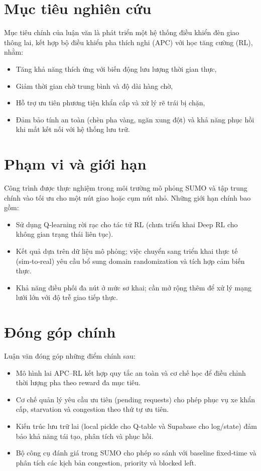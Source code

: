 \section{Mục tiêu nghiên cứu}

Mục tiêu chính của luận văn là phát triển một hệ thống điều khiển đèn giao thông lai, kết hợp bộ điều khiển pha thích nghi (APC) với học tăng cường (RL), nhằm:
\begin{itemize}
    \item Tăng khả năng thích ứng với biến động lưu lượng thời gian thực,
    \item Giảm thời gian chờ trung bình và độ dài hàng chờ,
    \item Hỗ trợ ưu tiên phương tiện khẩn cấp và xử lý rẽ trái bị chặn,
    \item Đảm bảo tính an toàn (chèn pha vàng, ngăn xung đột) và khả năng phục hồi khi mất kết nối với hệ thống lưu trữ.
\end{itemize}

\section{Phạm vi và giới hạn}

Công trình được thực nghiệm trong môi trường mô phỏng SUMO và tập trung chính vào tối ưu cho một nút giao hoặc cụm nút nhỏ. Những giới hạn chính bao gồm:
\begin{itemize}
    \item Sử dụng Q‑learning rời rạc cho tác tử RL (chưa triển khai Deep RL cho không gian trạng thái liên tục).
    \item Kết quả dựa trên dữ liệu mô phỏng; việc chuyển sang triển khai thực tế (sim‑to‑real) yêu cầu bổ sung domain randomization và tích hợp cảm biến thực.
    \item Khả năng điều phối đa nút ở mức sơ khai; cần mở rộng thêm để xử lý mạng lưới lớn với độ trễ giao tiếp thực.
\end{itemize}

\section{Đóng góp chính}

Luận văn đóng góp những điểm chính sau:
\begin{itemize}
    \item Mô hình lai APC–RL kết hợp quy tắc an toàn và cơ chế học để điều chỉnh thời lượng pha theo reward đa mục tiêu.
    \item Cơ chế quản lý yêu cầu ưu tiên (pending requests) cho phép phục vụ xe khẩn cấp, starvation và congestion theo thứ tự ưu tiên.
    \item Kiến trúc lưu trữ lai (local pickle cho Q‑table và Supabase cho log/state) đảm bảo khả năng tái tạo, phân tích và phục hồi.
    \item Bộ công cụ đánh giá trong SUMO cho phép so sánh với baseline fixed‑time và phân tích các kịch bản congestion, priority và blocked left.
\end{itemize}

